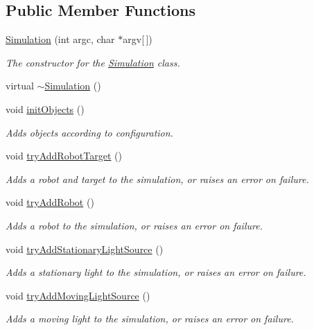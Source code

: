 \subsection*{Public Member Functions}
\begin{DoxyCompactItemize}
\item 
\hyperlink{classSimulation_adcfdbfb67f658534437a17d157099db9}{Simulation} (int argc, char $\ast$argv\mbox{[}$\,$\mbox{]})
\begin{DoxyCompactList}\small\item\em The constructor for the \hyperlink{classSimulation}{Simulation} class. \end{DoxyCompactList}\item 
virtual \hyperlink{classSimulation_a80fad3f57dfaf195a36f7bc49bc88279}{$\sim$\-Simulation} ()
\item 
void \hyperlink{classSimulation_a52eb5c1e4b471bcc38dd71b9432e1840}{init\-Objects} ()
\begin{DoxyCompactList}\small\item\em Adds objects according to configuration. \end{DoxyCompactList}\item 
void \hyperlink{classSimulation_aec7e9ba50cebf0bcb936608450c91916}{try\-Add\-Robot\-Target} ()
\begin{DoxyCompactList}\small\item\em Adds a robot and target to the simulation, or raises an error on failure. \end{DoxyCompactList}\item 
void \hyperlink{classSimulation_a0581c8385e2ab00ee4bda7252ae713e3}{try\-Add\-Robot} ()
\begin{DoxyCompactList}\small\item\em Adds a robot to the simulation, or raises an error on failure. \end{DoxyCompactList}\item 
void \hyperlink{classSimulation_ab8614040d41b38ae0121316d1f0c19fc}{try\-Add\-Stationary\-Light\-Source} ()
\begin{DoxyCompactList}\small\item\em Adds a stationary light to the simulation, or raises an error on failure. \end{DoxyCompactList}\item 
void \hyperlink{classSimulation_a4d569e8e740c702a3a1456944f1461d1}{try\-Add\-Moving\-Light\-Source} ()
\begin{DoxyCompactList}\small\item\em Adds a moving light to the simulation, or raises an error on failure. \end{DoxyCompactList}\item 

\end{DoxyCompactItemize}
